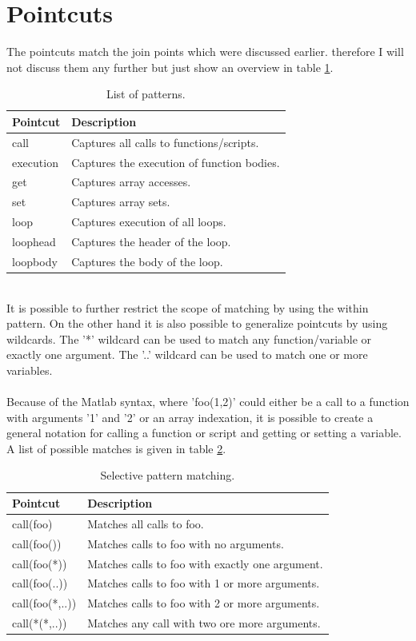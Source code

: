 \documentclass[a4paper]{report}
\begin{document}
\section{Pointcuts}
The pointcuts match the join points which were discussed earlier. therefore I will not discuss them any further but just show an overview in table \ref{tab:Matlab_Patterns}.\\
\begin{table}[h!]
\centering
\begin{tabular}{l|l}
\hline
Pointcut & Description\\
\hline
\hline
call & Captures all calls to functions/scripts.\\
execution & Captures the execution of function bodies.\\
get & Captures array accesses.\\
set & Captures array sets.\\
loop & Captures execution of all loops.\\
loophead & Captures the header of the loop.\\
loopbody & Captures the body of the loop.\\
\hline
\end{tabular}
\caption{List of patterns.}
\label{tab:Matlab_Patterns}
\end{table}\\
It is possible to further restrict the scope of matching by using the within pattern. On the other hand it is also possible to generalize pointcuts by using wildcards. The '*' wildcard can be used to match any function/variable or exactly one argument. The '..' wildcard can be used to match one or more variables.\\
\\
Because of the Matlab syntax, where 'foo(1,2)' could either be a call to a function with arguments '1' and '2' or an array indexation, it is possible to create a general notation for calling a function or script and getting or setting a variable. A list of possible matches is given in table \ref{tab:Matlab_PatternExamples}.\\
\begin{table}[h!]
\centering
\begin{tabular}{l|l}
\hline
Pointcut & Description\\
\hline
\hline
call(foo) & Matches all calls to foo.\\
call(foo()) & Matches calls to foo with no arguments.\\
call(foo(*)) & Matches calls to foo with exactly one argument.\\
call(foo(..)) & Matches calls to foo with 1 or more arguments.\\
call(foo(*,..)) & Matches calls to foo with 2 or more arguments.\\
call(*(*,..)) & Matches any call with two ore more arguments.\\
\hline
\end{tabular}
\caption{Selective pattern matching.}
\label{tab:Matlab_PatternExamples}
\end{table}\\
\end{document}
